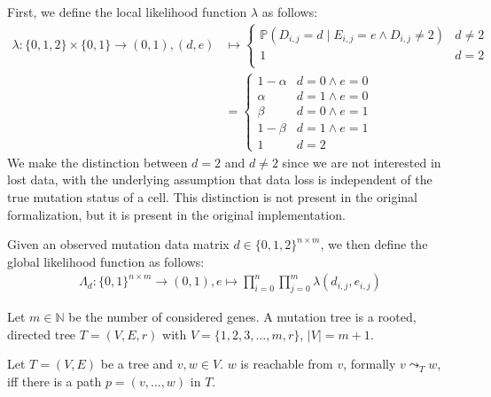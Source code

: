 \begin{definition}
    \label{def:likelihood}
    First, we define the local likelihood function $\lambda$ as follows:
    \begin{align*}
        \lambda: \{0, 1, 2\} \times \{0, 1\} \rightarrow (0, 1), (d, e) &\mapsto \begin{cases}
            \mathbb{P}(D_{i,j} = d \mid E_{i,j} = e \wedge D_{i,j} \neq 2) & d \neq 2 \\
            1 & d = 2 \\
        \end{cases} \\
        &= \begin{cases}
            1-\alpha & d = 0 \wedge e = 0 \\
            \alpha & d = 1 \wedge e = 0 \\
            \beta & d = 0 \wedge e = 1 \\
            1-\beta & d = 1 \wedge e = 1 \\
            1 & d = 2
        \end{cases}
    \end{align*}
    We make the distinction between $d = 2$ and $d \neq 2$ since we are not interested in lost data, with the underlying assumption that data loss is independent of the true mutation status of a cell. This distinction is not present in the original formalization, but it is present in the original implementation. 

    Given an observed mutation data matrix $d \in \{0,1,2\}^{n \times m}$, we then define the global likelihood function as follows:
    \begin{align*}
        \Lambda_d : \{0,1\}^{n \times m} \rightarrow (0,1), e \mapsto \prod_{i = 0}^n \prod_{j = 0}^m \lambda(d_{i,j}, e_{i,j})
    \end{align*}
\end{definition}


\begin{definition}
    \label{def:mutation_tree}
    Let $m \in \mathbb{N}$ be the number of considered genes. A mutation tree is a rooted, directed tree $T = (V, E, r)$ with $V = \{1, 2, 3, \dots, m, r\}$, $|V| = m+1$.
\end{definition}

\begin{definition}
    \label{def:reachability}
    Let $T = (V, E)$ be a tree and $v, w \in V$. $w$ is reachable from $v$, formally $v \leadsto_T w$, iff there is a path $p = (v, \dots, w)$ in $T$.
\end{definition}

